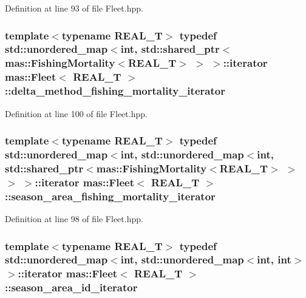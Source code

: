 Definition at line 93 of file Fleet.\-hpp.

\hypertarget{structmas_1_1_fleet_a446379b7a809ae7e2dd208c577e87a20}{
\subsubsection[{delta\-\_\-method\-\_\-fishing\-\_\-mortality\-\_\-iterator}]{\setlength{\rightskip}{0pt plus 5cm}template$<$typename R\-E\-A\-L\-\_\-\-T$>$ typedef std\-::unordered\-\_\-map$<$int, std\-::shared\-\_\-ptr$<${\bf mas\-::\-Fishing\-Mortality}$<$R\-E\-A\-L\-\_\-\-T$>$ $>$ $>$\-::iterator {\bf mas\-::\-Fleet}$<$ R\-E\-A\-L\-\_\-\-T $>$\-::{\bf delta\-\_\-method\-\_\-fishing\-\_\-mortality\-\_\-iterator}}}\label{structmas_1_1_fleet_a446379b7a809ae7e2dd208c577e87a20}


Definition at line 100 of file Fleet.\-hpp.

\hypertarget{structmas_1_1_fleet_aab7bbd15fe8e99db584f6d936c028bf3}{
\subsubsection[{season\-\_\-area\-\_\-fishing\-\_\-mortality\-\_\-iterator}]{\setlength{\rightskip}{0pt plus 5cm}template$<$typename R\-E\-A\-L\-\_\-\-T$>$ typedef std\-::unordered\-\_\-map$<$int, std\-::unordered\-\_\-map$<$int, std\-::shared\-\_\-ptr$<${\bf mas\-::\-Fishing\-Mortality}$<$R\-E\-A\-L\-\_\-\-T$>$ $>$ $>$ $>$\-::iterator {\bf mas\-::\-Fleet}$<$ R\-E\-A\-L\-\_\-\-T $>$\-::{\bf season\-\_\-area\-\_\-fishing\-\_\-mortality\-\_\-iterator}}}\label{structmas_1_1_fleet_aab7bbd15fe8e99db584f6d936c028bf3}


Definition at line 98 of file Fleet.\-hpp.

\hypertarget{structmas_1_1_fleet_ad3f5709dbe6c7d4b2d9082783272a48a}{
\subsubsection[{season\-\_\-area\-\_\-id\-\_\-iterator}]{\setlength{\rightskip}{0pt plus 5cm}template$<$typename R\-E\-A\-L\-\_\-\-T$>$ typedef std\-::unordered\-\_\-map$<$int, std\-::unordered\-\_\-map$<$int, int$>$ $>$\-::iterator {\bf mas\-::\-Fleet}$<$ R\-E\-A\-L\-\_\-\-T $>$\-::{\bf season\-\_\-area\-\_\-id\-\_\-iterator}}}\label{structmas_1_1_fleet_ad3f5709dbe6c7d4b2d9082783272a48a}



